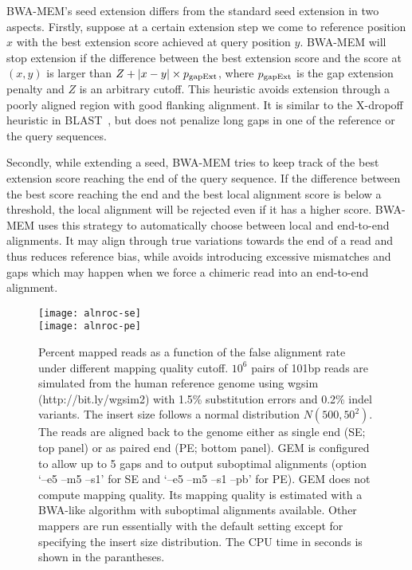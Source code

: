 \documentclass{bioinfo}
\begin{document}
\begin{methods}
BWA-MEM's seed extension differs from the standard seed extension in two
aspects. Firstly, suppose at a certain extension step we come to reference
position $x$ with the best extension score achieved at query position $y$.
BWA-MEM will stop extension if the difference between the best extension score
and the score at $(x,y)$ is larger than $Z+|x-y|\times p_{\rm gapExt}$, where
$p_{\rm gapExt}$ is the gap extension penalty and $Z$ is an arbitrary cutoff.
This heuristic avoids extension through a poorly aligned region with good
flanking alignment. It is similar to the X-dropoff heuristic in
BLAST~\citep{Altschul:1997vn}, but does not penalize long gaps in one of the
reference or the query sequences.

Secondly, while extending a seed, BWA-MEM tries to keep track of the best
extension score reaching the end of the query sequence. If the difference
between the best score reaching the end and the best local alignment score is
below a threshold, the local alignment will be rejected even if it has a higher
score. BWA-MEM uses this strategy to automatically choose between local and
end-to-end alignments. It may align through true variations towards the end of
a read and thus reduces reference bias, while avoids introducing excessive
mismatches and gaps which may happen when we force a chimeric read into an
end-to-end alignment.

\begin{figure}[tb]
\centering
\texttt{[image: alnroc-se]}\\
\texttt{[image: alnroc-pe]}
\caption{Percent mapped reads as a function of the false alignment rate under
different mapping quality cutoff. $10^6$ pairs of 101bp reads are simulated
from the human reference genome using wgsim (http://bit.ly/wgsim2) with 1.5\%
substitution errors and 0.2\% indel variants. The insert size follows a normal
distribution $N(500,50^2)$. The reads are aligned back to the genome either as
single end (SE; top panel) or as paired end (PE; bottom panel). GEM is
configured to allow up to 5 gaps and to output suboptimal alignments (option
`--e5 --m5 --s1' for SE and `--e5 --m5 --s1 --pb' for PE). GEM does not compute
mapping quality. Its mapping quality is estimated with a BWA-like algorithm
with suboptimal alignments available. Other mappers are run essentially with
the default setting except for specifying the insert size distribution. The CPU
time in seconds is shown in the parantheses.}\label{fig:eval}
\end{figure}


\end{methods}
\end{document}
